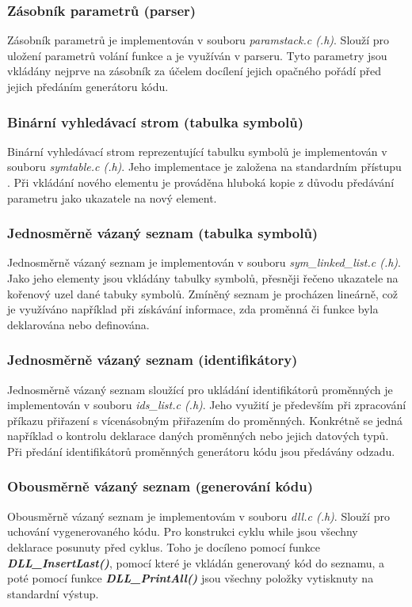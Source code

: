 \documentclass[a4paper, 12pt]{article}
\begin{document}
\subsubsection{Zásobník parametrů (parser)}
Zásobník parametrů je implementován v souboru \textit{paramstack.c (.h)}. Slouží pro uložení parametrů volání funkce a je využíván v parseru. Tyto parametry jsou vkládány nejprve na zásobník za účelem docílení jejich opačného pořádí před jejich předáním generátoru kódu.

\subsubsection{Binární vyhledávací strom (tabulka symbolů)}
Binární vyhledávací strom reprezentující tabulku symbolů je implementován v souboru \textit{symtable.c (.h)}. Jeho implementace je založena na standardním přístupu \cite{pruvodce2017}. Při vkládání nového elementu je prováděna hluboká kopie z důvodu předávání parametru jako ukazatele na nový element.

\subsubsection{Jednosměrně vázaný seznam (tabulka symbolů)}
Jednosměrně vázaný seznam je implementován v souboru \textit{sym\_linked\_list.c (.h)}. Jako jeho elementy jsou vkládány tabulky symbolů, přesněji řečeno ukazatele na kořenový uzel dané tabuky symbolů. Zmíněný seznam je procházen lineárně, což je využíváno například při získávání informace, zda proměnná či funkce byla deklarována nebo definována.

\subsubsection{Jednosměrně vázaný seznam (identifikátory)}
Jednosměrně vázaný seznam sloužící pro ukládání identifikátorů proměnných je implementován v souboru \textit{ids\_list.c (.h)}. Jeho využití je především při zpracování příkazu přiřazení s vícenásobným přiřazením do proměnných. Konkrétně se jedná například o kontrolu deklarace daných proměnných nebo jejich datových typů. Při předání identifikátorů proměnných generátoru kódu jsou předávány odzadu.

\subsubsection{Obousměrně vázaný seznam (generování kódu)}
Obousměrně vázaný seznam je implementovám v souboru \textit{dll.c (.h)}. Slouží pro uchování vygenerovaného kódu. Pro konstrukci cyklu while jsou všechny deklarace posunuty před cyklus. Toho je docíleno pomocí funkce \textit{\textbf{DLL\_InsertLast()}}, pomocí které je vkládán generovaný kód do seznamu, a poté pomocí funkce \textit{\textbf{DLL\_PrintAll()}} jsou všechny položky vytisknuty na standardní výstup.
\end{document}
